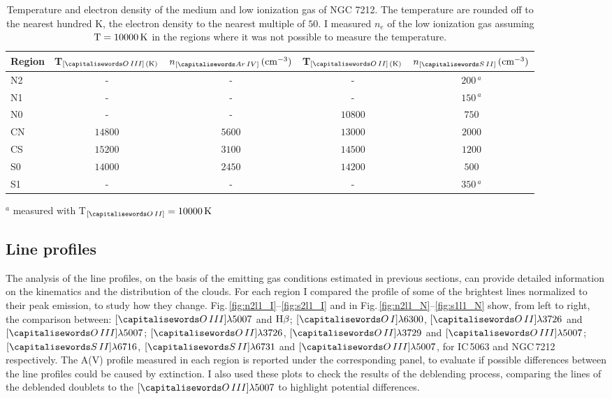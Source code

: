 \documentclass[../thesis.tex]{subfiles}
\begin{document}
\begin{table}
\caption[]{Temperature and electron density of the medium and low ionization gas of NGC 7212.
The temperature are rounded off to the nearest hundred K, the electron density to the nearest multiple of $50$. 
I measured $n_e$ of the low ionization gas assuming $\rm{T}=10000\,\si{K}$ in the regions where it was not possible to measure the temperature.}
\label{tab:ted_n}
\centering
\begin{threeparttable}
\begin{tabular}{lcccc}
\hline
Region&T$_{[\ion{O}{III}]\,(\si{K})}$&$n_{[\ion{Ar}{IV}]}\,(\si{cm^{-3}})$&T$_{[\ion{O}{II}]\,(\si{K})}$&$n_{[\ion{S}{II}]}\,(\si{cm^{-3}})$\\
\hline
N2&-&-&-&$200\,^a$\\
N1&-&-&-&$150\,^a$\\
N0&-&-&$10800$&$750$\\
CN&$14800$&$5600$&$13000$&$2000$\\
CS&$15200$&$3100$&$14500$&$1200$\\
S0&$14000$&$2450$&$14200$&$500$\\
S1&-&-&-&$350\,^a$\\
\hline
\end{tabular}
\begin{tablenotes}
\item $^a$ measured with T$_{[\ion{O}{II}]}= 10000\,\si{K}$
\end{tablenotes}
\end{threeparttable}
\end{table}

\subsection{Line profiles}
\label{sec:lineprof}

The analysis of the line profiles, on the basis of the emitting gas conditions estimated in previous sections, can provide detailed information on the kinematics and the distribution of the clouds.
For each region I compared the profile of some of the brightest lines normalized to their peak emission, to study how they change.
Fig.\,\ref{fig:n2l1_I}--\ref{fig:s2l1_I} and in Fig.\,\ref{fig:n2l1_N}--\ref{fig:s1l1_N} show, from left to right, the comparison between: $[\ion{O}{III}]\lambda5007$ and $\rm H\beta$; $[\ion{O}{I}]\lambda6300$, $[\ion{O}{II}]\lambda3726$ and $[\ion{O}{III}]\lambda5007$; $[\ion{O}{II}]\lambda3726$, $[\ion{O}{II}]\lambda3729$ and $[\ion{O}{III}]\lambda5007$; $[\ion{S}{II}]\lambda6716$, $[\ion{S}{II}]\lambda6731$ and $[\ion{O}{III}]\lambda5007$, for IC\,5063 and NGC\,7212 respectively.
The A(V) profile measured in each region is reported under the corresponding panel, to evaluate if possible differences between the line profiles could be caused by extinction.
I also used these plots to check the results of the deblending process, comparing the lines of the deblended doublets to the $[\ion{O}{III}]\lambda5007$ to highlight potential differences.
\end{document}
